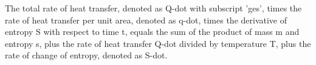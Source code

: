 The total rate of heat transfer, denoted as Q-dot with subscript 'ges', times the rate of heat transfer per unit area, denoted as q-dot, times the derivative of entropy S with respect to time t, equals the sum of the product of mass m and entropy s, plus the rate of heat transfer Q-dot divided by temperature T, plus the rate of change of entropy, denoted as S-dot.